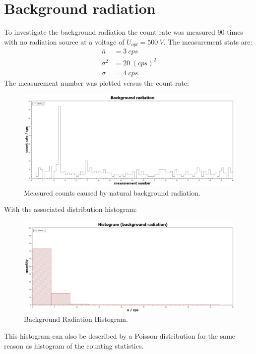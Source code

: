 \section{Background radiation}\label{sec:backgroundRadiation}
%
To investigate the background radiation the count rate was measured 90 times with no radiation source at a voltage of
\( U_{opt}=\SI{500}{V} \). The measurement stats are:
%
\begin{align}
\bar{n}     &=  \SI{3}{cps} \\
\sigma^{2}  &=  \SI{20}{(cps)^{2}} \\
\sigma      &=  \SI{4}{cps}
\end{align}
The measurement number was plotted versus the count rate:
\begin{figure}[H]
 \centering
 \includegraphics[width=.9\textwidth]{scidavis/Fig.10_Background radiation.jpg}
 \caption[Background radiation cps]{Measured counts caused by natural background radiation.}
 \label{fig:backgroundRad}
\end{figure}
With the associated distribution histogram:
\begin{figure}[H]
 \centering
 \includegraphics[width=.9\textwidth]{scidavis/Fig.11_Histogram (background radiation).jpg}
 \caption[Back Rad Hist]{Background Radiation Histogram.}
 \label{fig:backgroundRadHistogram}
\end{figure}
This histogram can also be described by a Poisson-distribution for the same reason as histogram of the counting
statistics.
%
